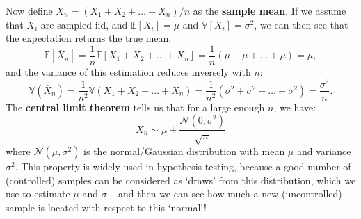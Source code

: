 \documentclass{article}
\begin{document}
{\flushleft Now} define $\overline{X}_n=(X_1+X_2+\dots+X_n)/n$ as the \textbf{sample mean}. If we assume that $X_i$ are sampled iid, and $\mathbb{E}[X_i]=\mu$ and $\mathbb{V}[X_i]=\sigma^2$, we can then see that the expectation returns the true mean:
\begin{equation}
    \mathbb{E}[\overline{X}_n] = \frac{1}{n}\mathbb{E}[X_1+X_2+\dots+X_n]=\frac{1}{n}(\mu+\mu+\dots+\mu)=\mu,
\end{equation}
and the variance of this estimation reduces inversely with $n$:
\begin{equation}
    \mathbb{V}(\overline{X}_n) = \frac{1}{n^2}\mathbb{V}(X_1+X_2+\dots+X_n) = \frac{1}{n^2}(\sigma^2+\sigma^2+\dots+\sigma^2) = \frac{\sigma^2}{n}.
\end{equation}
The \textbf{central limit theorem} tells us that for a large enough $n$, we have:
\begin{equation}
    \overline{X}_n \sim \mu + \frac{\mathcal{N}(0,\sigma^2)}{\sqrt{n}}
\end{equation}
where $\mathcal{N}(\mu,\sigma^2)$ is the normal/Gaussian distribution with mean $\mu$ and variance $\sigma^2$. 
This property is widely used in hypothesis testing, because a good number of (controlled) samples can be considered as `draws' from this distribution, which we use to estimate $\mu$ and $\sigma$ -- and then we can see how much a new (uncontrolled) sample is located with respect to this `normal'!
\end{document}
